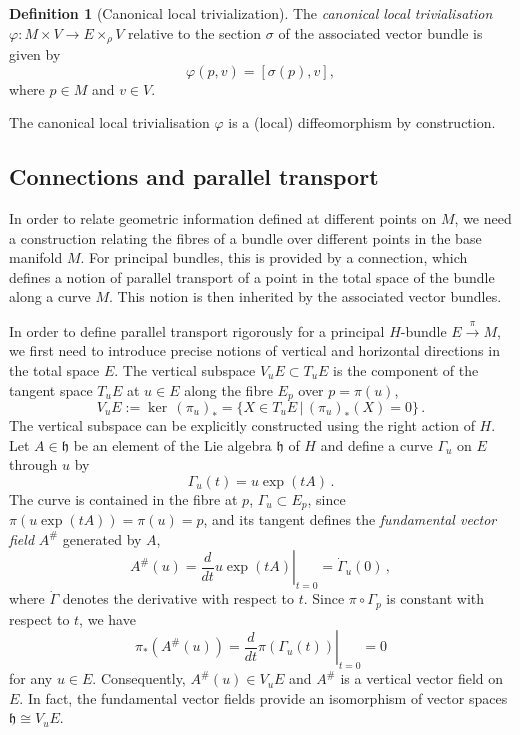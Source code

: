 \documentclass[12pt,a4paper]{article}
\numberwithin{equation}{section}
\theoremstyle{plain}
\theoremstyle{definition}
\newtheorem{definition}[theorem]{Definition}
\theoremstyle{remark}
\begin{document}
\begin{definition}[Canonical local trivialization]\label{dfn:canonical_local_trivialization}
    The \textit{canonical local trivialisation} $\varphi:M\times V\to E\times_\rho V$ relative to the section $\sigma$ of the associated vector bundle is given by
    \begin{equation}
        \varphi(p,v)=[\sigma(p),v],
    \end{equation}
    where $p\in M$ and $v\in V$.
\end{definition}
The canonical local trivialisation $\varphi$ is a (local) diffeomorphism by construction.

\subsection{Connections and parallel transport}\label{sec:connections_parallel_transport}
In order to relate geometric information defined at different points on $M$, we need a construction relating the fibres of a bundle over different points in the base manifold $M$. For principal bundles, this is provided by a connection, which defines a notion of parallel transport of a point in the total space of the bundle along a curve $M$. This notion is then inherited by the associated vector bundles.

In order to define parallel transport rigorously for a principal $H$-bundle $E\overset{\pi}{\rightarrow}M$, we first need to introduce precise notions of vertical and horizontal directions in the total space $E$. The vertical subspace $V_uE \subset T_uE$ is the component  of the tangent space $T_uE$ at $u \in E$ along the fibre $E_p$ over $p = \pi(u)$,
\begin{equation}
    V_uE := \ker \, (\pi_u)_* = \{X \in T_uE\,|\,(\pi_u)_*(X) = 0\}\,.
\end{equation}
The vertical subspace can be explicitly constructed using the right action of $H$. Let $A\in\mathfrak{h}$ be an element of the Lie algebra $\mathfrak{h}$ of $H$ and define a curve $\Gamma_u$ on $E$ through $u$ by
\begin{equation}
    \Gamma_u(t)=u\exp{(tA)} \,.
\end{equation}
The curve is contained in the fibre at $p$, $\Gamma_u \subset E_p$, since $\pi(u\exp{(tA)}) = \pi(u) = p$, and its tangent defines the \textit{fundamental vector field} $A^\#$ generated by $A$,
\begin{equation}
    A^\#(u)=\left.\frac{d}{dt}u\exp{(tA)}\right|_{t=0}=\dot{\Gamma}_u(0) \,,
\end{equation}
where $\dot{\Gamma}$ denotes the derivative with respect to $t$. Since $\pi\circ\Gamma_p$ is constant with respect to $t$, we have
\begin{equation}
    \pi_*(A^\#(u))=\left.\frac{d}{dt}\pi(\Gamma_u(t))\right|_{t=0}=0
\end{equation}
for any $u\in E$. Consequently, $A^\#(u) \in V_uE$ and $A^\#$ is a vertical vector field on $E$. In fact, the fundamental vector fields provide an isomorphism of vector spaces $\mathfrak{h} \cong V_uE$.
\end{document}

